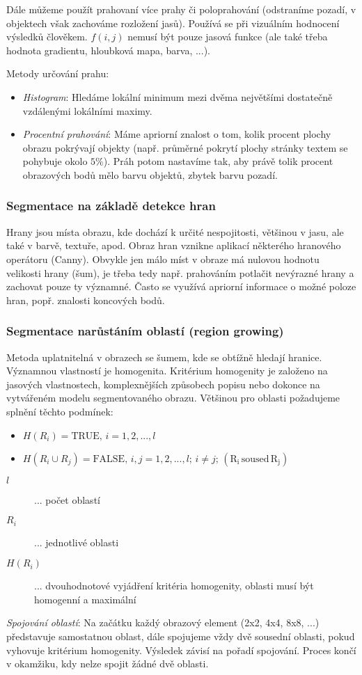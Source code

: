Dále můžeme použít prahovaní více prahy či poloprahování (odstraníme pozadí, v objektech však zachováme rozložení jasů). Používá se při vizuálním hodnocení výsledků člověkem. $ f(i,j) $ nemusí být pouze jasová funkce (ale také třeba hodnota gradientu, hloubková mapa, barva, ...).

Metody určování prahu:
\begin{itemize}
\item \textit{Histogram}: Hledáme lokální minimum mezi dvěma největšími dostatečně vzdálenými lokálními maximy.
\item \textit{Procentní prahování}: Máme apriorní znalost o tom, kolik procent plochy obrazu pokrývají objekty (např. průměrné pokrytí plochy stránky textem se pohybuje okolo $ 5\% $). Práh potom nastavíme tak, aby právě tolik procent obrazových bodů mělo barvu objektů, zbytek barvu pozadí.
\end{itemize}

\subsubsection*{Segmentace na základě detekce hran}
Hrany jsou místa obrazu, kde dochází k určité nespojitosti, většinou v jasu, ale také v barvě, textuře, apod. Obraz hran vznikne aplikací některého hranového operátoru (Canny). Obvykle jen málo míst v obraze má nulovou hodnotu velikosti hrany (šum), je třeba tedy např. prahováním potlačit nevýrazné hrany a zachovat pouze ty významné. Často se využívá apriorní informace o možné poloze hran, popř. znalosti koncových bodů.

\subsubsection*{Segmentace narůstáním oblastí (region growing)}
Metoda uplatnitelná v obrazech se šumem, kde se obtížně hledají hranice. Významnou vlastností je homogenita. Kritérium homogenity je založeno na jasových vlastnostech, komplexnějších způsobech popisu nebo dokonce na vytvářeném modelu segmentovaného obrazu. Většinou pro oblasti požadujeme splnění těchto podmínek:
\begin{itemize}
\item $ H(R_i) = \mathrm{TRUE}, \, i=1,2,...,l $
\item $ H(R_i \cup R_j) = \mathrm{FALSE}, \, i,j=1,2,...,l; \, i \neq j; \, \mathrm{(R_i \, soused \, R_j)} $
\end{itemize}
\begin{description}
\item[$ l $] ... počet oblastí
\item[$ R_i $] ... jednotlivé oblasti
\item[$ H(R_i) $] ... dvouhodnotové vyjádření kritéria homogenity, oblasti musí být homogenní a maximální
\end{description}
\textit{Spojování oblastí}: Na začátku každý obrazový element (2x2, 4x4, 8x8, ...) představuje samostatnou oblast, dále spojujeme vždy dvě sousední oblasti, pokud vyhovuje kritérium homogenity. Výsledek závisí na pořadí spojování. Proces končí v okamžiku, kdy nelze spojit žádné dvě oblasti.


